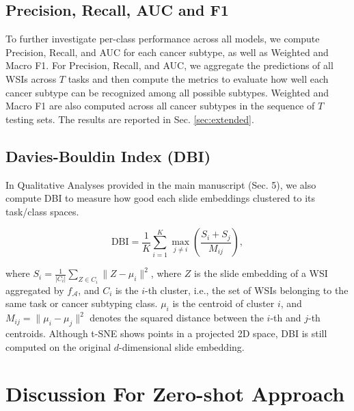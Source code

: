 \documentclass[10pt,twocolumn,letterpaper]{article}
\begin{document}

\subsection{{Precision, Recall, AUC and F1}} {To further investigate per-class performance across all models, we compute Precision, Recall, and AUC for each cancer subtype, as well as Weighted and Macro F1. For Precision, Recall, and AUC, we aggregate the predictions of all WSIs across $T$ tasks and then compute the metrics to evaluate how well each cancer subtype can be recognized among all possible subtypes. Weighted and Macro F1 are also computed across all cancer subtypes in the sequence of $T$ testing sets. The results are reported in Sec. \ref{sec:extended}.}

\subsection{Davies-Bouldin Index (DBI)} In Qualitative Analyses provided in the main manuscript (Sec. 5), we also compute DBI to measure how good each slide embeddings clustered to its task/class spaces. 

\begin{equation}
\text{DBI} = \frac{1}{K} \sum_{i=1}^{K} \max_{j \ne i} \left( \frac{S_i + S_j}{M_{ij}} \right),
\end{equation}

\noindent where $S_i = \frac{1}{|C_i|} \sum_{Z \in C_i} \| Z - \mu_i \|^2$, where $Z$ is the slide embedding of a WSI aggregated by $f_{\mathcal{A}}$, and $C_i$ is the $i$-th cluster, i.e., the set of WSIs belonging to the same task or cancer subtyping class. $\mu_i$ is the centroid of cluster $i$, and $M_{ij} = \| \mu_i - \mu_j \|^2$ denotes the squared distance between the $i$-th and $j$-th centroids. Although t-SNE shows points in a projected 2D space, DBI is still computed on the original $d$-dimensional slide embedding.

\section{Discussion For Zero-shot Approach}\label{sec:zero-shot}
\end{document}
